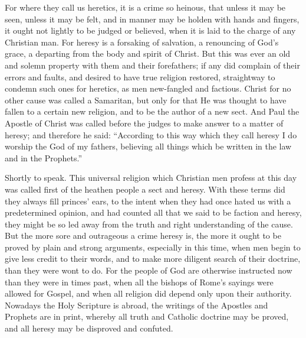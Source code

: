 For where they call us heretics, it is a crime so heinous, that unless
it may be seen, unless it may be felt, and in manner may be holden with
hands and fingers, it ought not lightly to be judged or believed, when
it is laid to the charge of any Christian man. For heresy is a
forsaking of salvation, a renouncing of God’s grace, a departing
from the body and spirit of Christ. But this was ever an old and
solemn property with them and their forefathers; if any did complain
of their errors and faults, and desired to have true religion restored,
straightway to condemn such ones for heretics, as men new-fangled and
factious. Christ for no other cause was called a Samaritan, but
only for that He was thought to have fallen to a certain new religion,
and to be the author of a new sect. And Paul the Apostle of Christ
was called before the judges to make answer to a matter of heresy; and
therefore he said: “According to this way which they call heresy
I do worship the God of my fathers, believing all things which be written
in the law and in the Prophets.”

Shortly to speak. This universal religion which Christian men
profess at this day was called first of the heathen people a sect and
heresy. With these terms did they always fill princes’ ears,
to the intent when they had once hated us with a predetermined opinion,
and had counted all that we said to be faction and heresy, they might
be so led away from the truth and right understanding of the cause.
But the more sore and outrageous a crime heresy is, the more it ought
to be proved by plain and strong arguments, especially in this time,
when men begin to give less credit to their words, and to make more
diligent search of their doctrine, than they were wont to do.
For the people of God are otherwise instructed now than they were in
times past, when all the bishops of Rome’s sayings were allowed
for Gospel, and when all religion did depend only upon their authority.
Nowadays the Holy Scripture is abroad, the writings of the Apostles
and Prophets are in print, whereby all truth and Catholic doctrine may
be proved, and all heresy may be disproved and confuted.

